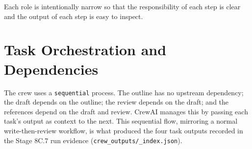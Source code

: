 Each role is intentionally narrow so that the responsibility of each step is
clear and the output of each step is easy to inspect.

\section{Task Orchestration and Dependencies}

The crew uses a \texttt{sequential} process. The outline has no upstream
dependency; the draft depends on the outline; the review depends on the
draft; and the references depend on the draft and review. CrewAI manages this
by passing each task's output as context to the next. This sequential flow,
mirroring a normal write-then-review workflow, is what produced the four task
outputs recorded in the Stage 8C.7 run evidence
(\texttt{crew\_outputs/\_index.json}).
